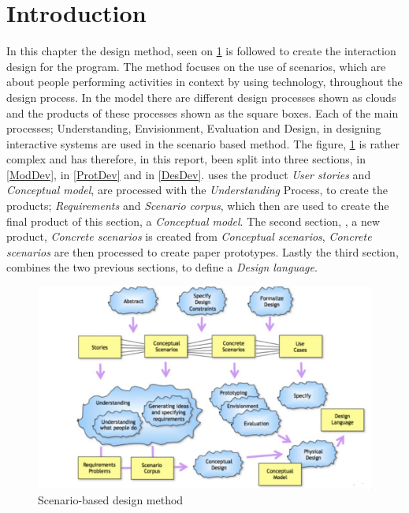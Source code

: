 \section{Introduction}
In this chapter the design method, seen on \cref{scenarioModel} is followed to create the interaction design for the program. The method focuses on the use of scenarios, which are about people performing activities in context by using technology, throughout the design process. In the model there are different design processes shown as clouds and the products of these processes shown as the square boxes. Each of the main processes; Understanding, Envisionment, Evaluation and Design, in designing interactive systems are used in the scenario based method. The figure, \cref{scenarioModel} is rather complex and has therefore, in this report, been split into three sections,  in \ref{ModDev},  in \ref{ProtDev} and  in \ref{DesDev}.  uses the product \textit{User stories} and \textit{Conceptual model}, are processed with the \textit{Understanding} Process, to create the products; \textit{Requirements} and \textit{Scenario corpus}, which then are used to create the final product of this section, a \textit{Conceptual model}. The second section, , a new product, \textit{Concrete scenarios} is created from \textit{Conceptual scenarios}, \textit{Concrete scenarios} are then processed to create paper prototypes. Lastly the third section,  combines the two previous sections, to define a \textit{Design language}.

\begin{figure}[H]
	\centering
	\includegraphics[width=1\textwidth]{Grafik/scenarioModel}
	\caption{Scenario-based design method}
	\label{scenarioModel}
\end{figure}